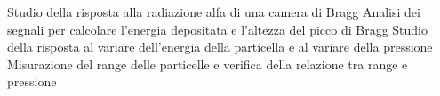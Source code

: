 Studio della risposta alla radiazione alfa di una camera di Bragg
Analisi dei segnali per calcolare l'energia depositata e l'altezza del picco di Bragg
Studio della risposta al variare dell'energia della particella e al variare della pressione
Misurazione del range delle particelle e verifica della relazione tra range e pressione
